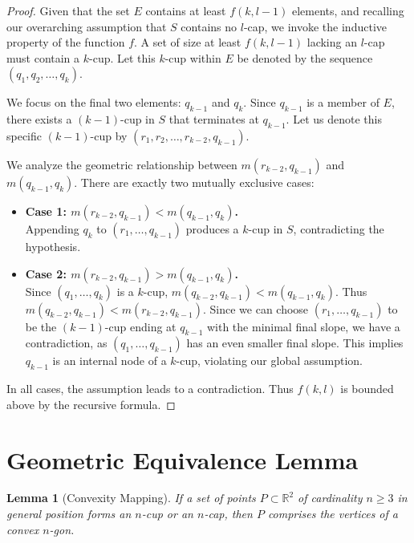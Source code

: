 \documentclass[11pt,a4paper]{article}
\newtheorem{lemma}[theorem]{Lemma}
\begin{document}
\begin{proof}
Given that the set $E$ contains at least $f(k, l-1)$ elements, and recalling our overarching assumption that $S$ contains no $l$-cap, we invoke the inductive property of the function $f$. A set of size at least $f(k, l-1)$ lacking an $l$-cap must contain a $k$-cup. Let this $k$-cup within $E$ be denoted by the sequence $(q_1, q_2, \dots, q_k)$.

We focus on the final two elements: $q_{k-1}$ and $q_k$. Since $q_{k-1}$ is a member of $E$, there exists a $(k-1)$-cup in $S$ that terminates at $q_{k-1}$.
Let us denote this specific $(k-1)$-cup by $(r_1, r_2, \dots, r_{k-2}, q_{k-1})$.

We analyze the geometric relationship between $m(r_{k-2}, q_{k-1})$ and $m(q_{k-1}, q_k)$.
There are exactly two mutually exclusive cases:
\begin{itemize}
    \item \textbf{Case 1: $m(r_{k-2}, q_{k-1}) < m(q_{k-1}, q_k)$.} \\
    Appending $q_k$ to $(r_1, \dots, q_{k-1})$ produces a $k$-cup in $S$, contradicting the hypothesis.

    \item \textbf{Case 2: $m(r_{k-2}, q_{k-1}) > m(q_{k-1}, q_k)$.} \\
    Since $(q_1, \dots, q_k)$ is a $k$-cup, $m(q_{k-2}, q_{k-1}) < m(q_{k-1}, q_k)$.
    Thus $m(q_{k-2}, q_{k-1}) < m(r_{k-2}, q_{k-1})$. Since we can choose $(r_1, \dots, q_{k-1})$ to be the $(k-1)$-cup ending at $q_{k-1}$ with the minimal final slope, we have a contradiction, as $(q_1, \dots, q_{k-1})$ has an even smaller final slope. This implies $q_{k-1}$ is an internal node of a $k$-cup, violating our global assumption.
\end{itemize}

In all cases, the assumption leads to a contradiction. Thus $f(k,l)$ is bounded above by the recursive formula.
\end{proof}

\section{Geometric Equivalence Lemma}

\begin{lemma}[Convexity Mapping]\label{lem:convex}
If a set of points $P \subset \mathbb{R}^2$ of cardinality $n \ge 3$ in general position forms an $n$-cup or an $n$-cap, then $P$ comprises the vertices of a convex $n$-gon.
\end{lemma}
\end{document}
